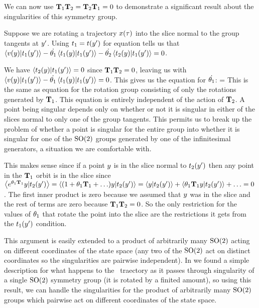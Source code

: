 {We can now use $\mathbf{T}_1 \mathbf{T}_2=\mathbf{T}_2 \mathbf{T}_1=0$ to demonstrate a significant result about the singularities of this symmetry group.

Suppose we are rotating a trajectory $x(\tau)$ into the slice normal to the group tangents at ${y'}$. Using $t_1=t({y'})$ for equation  tells us that
$\left\langle {\ensuremath{v}(\ensuremath{y})}|{t_1({y'})} \right\rangle-\dot{{\bf \theta}_1} \left\langle { \ensuremath{t}_1(\ensuremath{y})}|{t_1({y'})} \right\rangle-\dot{{\bf \theta}_2} \left\langle { \ensuremath{t}_2(\ensuremath{y})}|{t_1({y'})} \right\rangle=0$.

We have
$\left\langle {\ensuremath{t}_2(\ensuremath{y})}|{t_1({y'})} \right\rangle=0$ since $\mathbf{T}_1 \mathbf{T}_2=0$,
leaving us with $\left\langle {\ensuremath{v}(\ensuremath{y})}|{t_1({y'})} \right\rangle-\dot{{\bf \theta}_1}\left\langle {\ensuremath{t}_1(\ensuremath{y})}|{t_1({y'})} \right\rangle=0$. This gives us the equation for $\dot{{\bf \theta}_1}$:
\beq
{}=
\eeq
This is the same as equation  for the rotation group consisting of only the rotations generated by $\mathbf{T}_1$. This equation is entirely independent of the action of $\mathbf{T}_2$. A point being singular depends only on whether or not it is singular in either of the slices normal to only one of the group tangents. This permits us to break up the problem of whether a point is singular for the entire group into whether it is singular for one of the $\textrm{SO}(2)$ groups generated by one of the infinitesimal generators, a situation we are comfortable with.

This makes sense since if a point $y$ is in the slice normal to $t_2({y'})$ then any point in the $\mathbf{T}_1$ orbit is in the slice since $\left\langle {e^{\ensuremath{{\bf \theta}}_1 \ensuremath{\mathbf{T}}_1}\ensuremath{y}}|{t_2({y'})} \right\rangle=\left\langle {(1+\ensuremath{{\bf \theta}}_1 \ensuremath{\mathbf{T}}_1+\ldots)\ensuremath{y}}|{t_2({y'})} \right\rangle=\left\langle {\ensuremath{y}}|{t_2({y'})} \right\rangle+\left\langle {\ensuremath{{\bf \theta}}_1 \ensuremath{\mathbf{T}}_1 \ensuremath{y}}|{t_2({y'})} \right\rangle+\ldots=0$. The first inner product is zero because we assumed that $y$ was in the slice and the rest of terms are zero because $\mathbf{T}_1 \mathbf{T}_2=0$. So the only restriction for the values of ${\bf \theta}_1$ that rotate the point into the slice are the restrictions it gets from the $t_1({y'})$ condition.

This argument is easily extended to a product of arbitrarily many $\textrm{SO}(2)$ acting on different coordinates of the state space (any two of the $\textrm{SO}(2)$ act on distinct coordinates so the singularities are pairwise independent).
In  we found a simple description for what happens to the \reducedsp\ traectory as it passes through singularity of a single $\textrm{SO}(2)$ symmetry group (it is rotated by a finited amount), so using this result, we can handle the singularities for the product of arbitrarily many $\textrm{SO}(2)$ groups which pairwise act on different coordinates of the state space.


}
